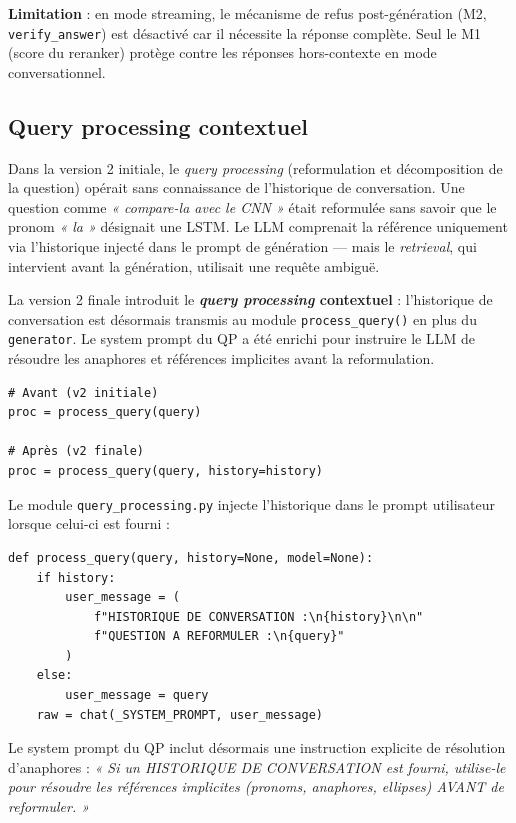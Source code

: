 \textbf{Limitation} : en mode streaming, le mécanisme de refus post-génération (M2, \texttt{verify\_answer}) est désactivé car il nécessite la réponse complète. Seul le M1 (score du reranker) protège contre les réponses hors-contexte en mode conversationnel.

\subsection{Query processing contextuel}
\label{sec:qp-contextuel}

Dans la version 2 initiale, le \textit{query processing} (reformulation et décomposition de la question) opérait sans connaissance de l'historique de conversation. Une question comme \textit{« compare-la avec le CNN »} était reformulée sans savoir que le pronom \textit{« la »} désignait une LSTM. Le LLM comprenait la référence uniquement via l'historique injecté dans le prompt de génération --- mais le \textit{retrieval}, qui intervient avant la génération, utilisait une requête ambiguë.

La version 2 finale introduit le \textbf{\textit{query processing} contextuel} : l'historique de conversation est désormais transmis au module \texttt{process\_query()} en plus du \texttt{generator}. Le system prompt du QP a été enrichi pour instruire le LLM de résoudre les anaphores et références implicites avant la reformulation.

\begin{lstlisting}[caption={Transmission de l'historique au QP (pipeline.py)}, label={lst:qp-contextuel}]
# Avant (v2 initiale)
proc = process_query(query)

# Après (v2 finale)
proc = process_query(query, history=history)
\end{lstlisting}

Le module \texttt{query\_processing.py} injecte l'historique dans le prompt utilisateur lorsque celui-ci est fourni :

\begin{lstlisting}[caption={Injection de l'historique dans le QP (query\_processing.py)}, label={lst:qp-history-inject}]
def process_query(query, history=None, model=None):
    if history:
        user_message = (
            f"HISTORIQUE DE CONVERSATION :\n{history}\n\n"
            f"QUESTION A REFORMULER :\n{query}"
        )
    else:
        user_message = query
    raw = chat(_SYSTEM_PROMPT, user_message)
\end{lstlisting}

Le system prompt du QP inclut désormais une instruction explicite de résolution d'anaphores : \textit{« Si un HISTORIQUE DE CONVERSATION est fourni, utilise-le pour résoudre les références implicites (pronoms, anaphores, ellipses) AVANT de reformuler. »}

